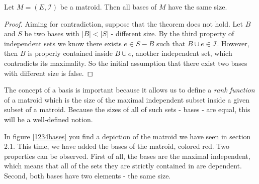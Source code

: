 \begin{theorem}
    Let $M = (E, \mathcal{I})$ be a matroid. Then all bases of $M$ have the same size.
\end{theorem}

\begin{proof}
    Aiming for contradiction, suppose that the theorem does not hold. Let $B$ and $S$ be two bases with $|B| < |S|$ - different size. By the third property of independent sets we know there exists $e \in S - B$ such that $ B \cup e \in \mathcal{I}$. However, then $B$ is properly contained inside $B \cup e$, another independent set, which contradicts its maximality. So the initial assumption that there exist two bases with different size is false.
\end{proof}

The concept of a basis is important because it allows us to define a \textit{rank function} of a matroid which is the size of the maximal independent subset inside a given subset of a matroid.  Because the sizes of all of such sets - bases - are equal, this will be a well-defined notion.

In figure \ref{1234bases} you find a depiction of the matroid we have seen in section 2.1. This time, we have added the bases of the matroid, colored red. Two properties can be observed. First of all, the bases are the maximal independent, which means that all of the sets they are strictly contained in are dependent. Second, both bases have two elements - the same size.

